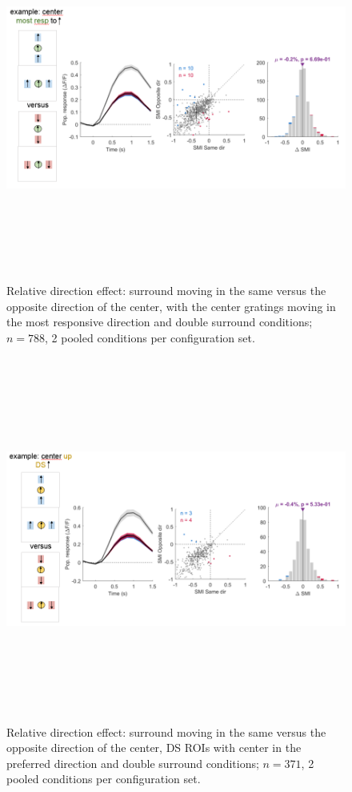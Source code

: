 \begin{figure}[H] \centering \includegraphics[width=12cm,height=12cm,keepaspectratio]{Figures/7.Results/finalPopulation/sel/diagrams/17.png} 
\caption{Relative direction effect: surround moving in the same versus the opposite direction of the center, with the center gratings moving in the most responsive direction and double surround conditions;  $n=788$, 2 pooled conditions per configuration set.} \label{17}
\end{figure}

\begin{figure}[H] \centering \includegraphics[width=12cm,height=12cm,keepaspectratio]{Figures/7.Results/finalPopulation/sel/diagrams/18.png} 
\caption{Relative direction effect: surround moving in the same versus the opposite direction of the center, DS ROIs with center in the preferred direction and double surround conditions;  $n=371$, 2 pooled conditions per configuration set.}\label{18}
\end{figure}

